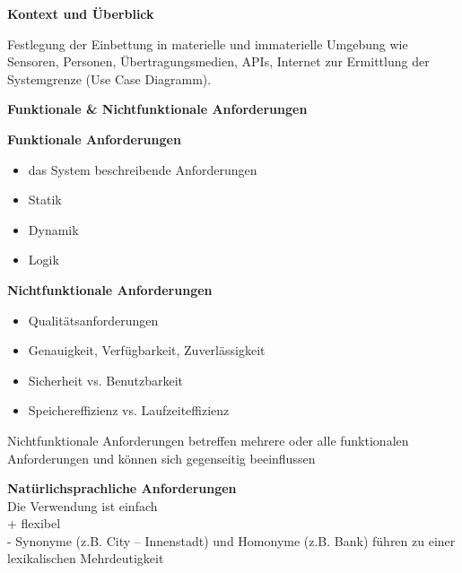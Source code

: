 \textbf{Kontext und Überblick} \\
\begin{minipage}{10cm}
Festlegung der Einbettung in materielle und immaterielle Umgebung wie Sensoren, Personen, Übertragungsmedien, APIs, Internet zur Ermittlung der Systemgrenze (Use Case Diagramm). 
\end{minipage}
\begin{minipage}{5cm}
\end{minipage}

\textbf{Funktionale \& Nichtfunktionale Anforderungen} \\
\begin{multicols}{2}

\textbf{Funktionale Anforderungen}
\begin{itemize}
	\item das System beschreibende Anforderungen
	\item Statik
	\item Dynamik
	\item Logik
\end{itemize}
\columnbreak
\textbf{Nichtfunktionale Anforderungen}
\begin{itemize}
	\item Qualitätsanforderungen
	\item Genauigkeit, Verfügbarkeit, Zuverlässigkeit
	\item Sicherheit vs. Benutzbarkeit
	\item Speichereffizienz vs. Laufzeiteffizienz
\end{itemize}
\end{multicols}
Nichtfunktionale Anforderungen betreffen mehrere oder alle funktionalen Anforderungen und können sich gegenseitig beeinflussen

\textbf{Natürlichsprachliche Anforderungen} \\
Die Verwendung ist einfach \\
+ flexibel \\
- Synonyme (z.B. City – Innenstadt) und Homonyme (z.B. Bank) führen zu einer lexikalischen Mehrdeutigkeit

